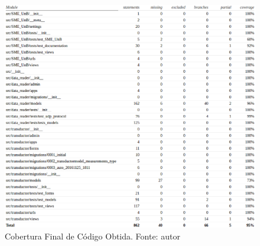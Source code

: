 \begin{figure}[!htpb]
    \centering
    \includegraphics[keepaspectratio=true,scale=0.5]{figuras/cobertura05.eps}
    \caption{Cobertura Final de Código Obtida. Fonte: autor}
    \label{cobertura05}
\end{figure}